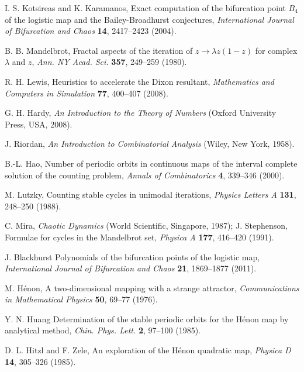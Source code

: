 \documentclass[twocolumn]{revtex4-1}
\begin{document}
\begin{thebibliography}{50}
  I. S. Kotsireas and K. Karamanos,
  Exact computation of the bifurcation point $B_4$ of the logistic map and
    the Bailey-Broadhurst conjectures,
  \textit{International Journal of Bifurcation and Chaos}
  \textbf{14},
  2417--2423
  (2004).

  B. B. Mandelbrot,
  Fractal aspects of the iteration of $z \rightarrow \lambda z(1-z)$
      for complex $\lambda$ and $z$,
  \textit{Ann. NY Acad. Sci.}
  \textbf{357},
  249--259
  (1980).

  R. H. Lewis,
  Heuristics to accelerate the Dixon resultant,
  \textit{Mathematics and Computers in Simulation}
  \textbf{77},
  400--407
  (2008).

 G. H. Hardy,
  \textit{An Introduction to the Theory of Numbers}
  (Oxford University Press, USA, 2008).

  J. Riordan,
  \textit{An Introduction to Combinatorial Analysis}
  (Wiley, New York, 1958).

 B.-L. Hao,
  Number of periodic orbits in continuous maps of
    the interval complete solution of the counting problem,
  \textit{Annals of Combinatorics}
  \textbf{4},
  339--346
  (2000).

  M. Lutzky,
  Counting stable cycles in unimodal iterations,
  \textit{Physics Letters A}
  \textbf{131},
  248--250
  (1988).

  C. Mira,
  \textit{Chaotic Dynamics}
  (World Scientific, Singapore, 1987);
  J. Stephenson,
  Formulae for cycles in the Mandelbrot set,
  \textit{Physica A}
  \textbf{177},
  416--420
  (1991).

  J. Blackhurst
  Polynomials of the bifurcation points of the logistic map,
  \textit{International Journal of Bifurcation and Chaos}
  \textbf{21},
  1869--1877
  (2011).

  M. H\'enon,
  A two-dimensional mapping with a strange attractor,
  \textit{Communications in Mathematical Physics}
  \textbf{50},
  69--77
  (1976).

  Y. N. Huang
  Determination of the stable periodic orbits for the H\'enon map by analytical method,
  \textit{Chin. Phys. Lett.}
  \textbf{2},
  97--100
  (1985).

  D. L. Hitzl and F. Zele,
  An exploration of the H\'enon quadratic map,
  \textit{Physica D}
  \textbf{14},
  305--326
  (1985).


\end{thebibliography}
\end{document}
